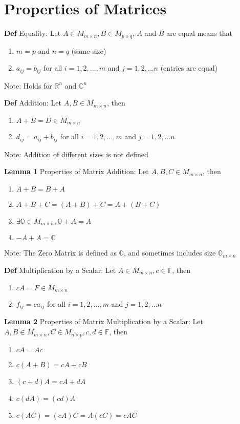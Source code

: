 \documentclass[11pt,notitlepage]{report}
\newcommand{\bb}[1]{\ensuremath{\mathbb{#1}}}
\begin{document}
\section{Properties of Matrices}

\textbf{Def} Equality: Let $A \in M_{m \times n}, B \in M_{p \times q}$, $A$ and $B$ are equal means that
\begin{enumerate}[label=(\roman*)]
    \item $m = p$ and $n = q$ (same size)
    \item $a_{ij} = b_{ij}$ for all $i = 1, 2, \dots, m$ and $j = 1, 2, \dots n$ (entries are equal)
\end{enumerate}
\hspace*{5mm} Note: Holds for $\bb R^n$ and $\bb C^n$

\textbf{Def} Addition: Let $A, B \in M_{m \times n}$, then
\begin{enumerate}[label=(\roman*)]
    \item $A + B = D \in M_{m \times n}$
    \item $d_{ij} = a_{ij} + b_{ij}$ for all $i = 1, 2, \dots, m$ and $j = 1, 2, \dots n$
\end{enumerate}
\hspace*{5mm} Note: Addition of different sizes is not defined

\textbf{Lemma 1} Properties of Matrix Addition: Let $A, B, C \in M_{m \times n}$, then
\begin{enumerate}[label=(\roman*)]
    \item $A + B = B + A$
    \item $A + B + C = (A + B) + C = A + (B + C)$
    \item $\exists \bb O \in M_{m \times n}, \bb O + A = A$
    \item $-A + A = \bb O$
\end{enumerate}
\hspace*{5mm} Note: The Zero Matrix is defined as $\bb O$, and sometimes includes size $\bb O_{m \times n}$

\newpage
\textbf{Def} Multiplication by a Scalar: Let $A \in M_{m \times n}, c \in \bb F$, then
\begin{enumerate}[label=(\roman*)]
    \item $cA = F \in M_{m \times n}$
    \item $f_{ij} = ca_{ij}$ for all $i = 1, 2, \dots, m$ and $j = 1, 2, \dots n$
\end{enumerate}

\textbf{Lemma 2} Properties of Matrix  Multiplication by a Scalar: Let $A, B \in M_{m \times n}, C \in M_{n \times p}, c, d \in \bb F$, then
\begin{enumerate}[label=(\roman*)]
    \item $cA = Ac$
    \item $c(A+B)=cA+cB$
    \item $(c+d)A = cA + dA$
    \item $c(dA) = (cd)A$
    \item $c(AC) = (cA)C = A(cC) = cAC$
\end{enumerate}
\end{document}
